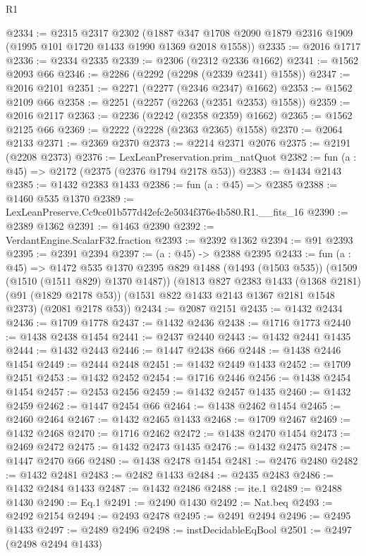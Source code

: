 \begin{lexlean}{R1}
\begin{coremodule}
@2334 := @2315
    @2317
    @2302
    (@1887 @347 @1708 @2090 @1879 @2316 @1909 (@1995 @101 @1720 @1433 @1990 @1369 @2018 @1558))
@2335 := @2016 @1717
@2336 := @2334 @2335
@2339 := @2306 (@2312 @2336 @1662)
@2341 := @1562 @2093 @66
@2346 := @2286 (@2292 (@2298 (@2339 @2341) @1558))
@2347 := @2016 @2101
@2351 := @2271 (@2277 (@2346 @2347) @1662)
@2353 := @1562 @2109 @66
@2358 := @2251 (@2257 (@2263 (@2351 @2353) @1558))
@2359 := @2016 @2117
@2363 := @2236 (@2242 (@2358 @2359) @1662)
@2365 := @1562 @2125 @66
@2369 := @2222 (@2228 (@2363 @2365) @1558)
@2370 := @2064 @2133
@2371 := @2369 @2370
@2373 := @2214 @2371 @2076
@2375 := @2191 (@2208 @2373)
@2376 := LexLeanPreservation.prim_natQuot
@2382 := fun (a : @45) => @2172 (@2375 (@2376 @1794 @2178 @53))
@2383 := @1434 @2143
@2385 := @1432 @2383 @1433
@2386 := fun (a : @45) => @2385
@2388 := @1460 @535 @1370
@2389 := LexLeanPreserve.Cc9ce01b577d42efc2e5034f376e4b580.R1.__fits_16
@2390 := @2389 @1362
@2391 := @1463 @2390
@2392 := VerdantEngine.ScalarF32.fraction
@2393 := @2392 @1362
@2394 := @91 @2393
@2395 := @2391 @2394
@2397 := (a : @45) -> @2388 @2395
@2433 := fun (a : @45) =>
  @1472
    @535
    @1370
    @2395
    @829
    @1488
    (@1493 (@1503 @535))
    (@1509 (@1510 (@1511 @829) @1370 @1487))
    (@1813
      @827
      @2383
      @1433
      (@1368 @2181)
      (@91 (@1829 @2178 @53))
      (@1531 @822 @1433 @2143 @1367 @2181 @1548 @2373)
      (@2081 @2178 @53))
@2434 := @2087 @2151
@2435 := @1432 @2434
@2436 := @1709 @1778
@2437 := @1432 @2436
@2438 := @1716 @1773
@2440 := @1438 @2438 @1454
@2441 := @2437 @2440
@2443 := @1432 @2441 @1435
@2444 := @1432 @2443
@2446 := @1447 @2438 @66
@2448 := @1438 @2446 @1454
@2449 := @2444 @2448
@2451 := @1432 @2449 @1433
@2452 := @1709 @2451
@2453 := @1432 @2452
@2454 := @1716 @2446
@2456 := @1438 @2454 @1454
@2457 := @2453 @2456
@2459 := @1432 @2457 @1435
@2460 := @1432 @2459
@2462 := @1447 @2454 @66
@2464 := @1438 @2462 @1454
@2465 := @2460 @2464
@2467 := @1432 @2465 @1433
@2468 := @1709 @2467
@2469 := @1432 @2468
@2470 := @1716 @2462
@2472 := @1438 @2470 @1454
@2473 := @2469 @2472
@2475 := @1432 @2473 @1435
@2476 := @1432 @2475
@2478 := @1447 @2470 @66
@2480 := @1438 @2478 @1454
@2481 := @2476 @2480
@2482 := @1432 @2481
@2483 := @2482 @1433
@2484 := @2435 @2483
@2486 := @1432 @2484 @1433
@2487 := @1432 @2486
@2488 := ite.{1}
@2489 := @2488 @1430
@2490 := Eq.{1}
@2491 := @2490 @1430
@2492 := Nat.beq
@2493 := @2492 @2154
@2494 := @2493 @2478
@2495 := @2491 @2494
@2496 := @2495 @1433
@2497 := @2489 @2496
@2498 := instDecidableEqBool
@2501 := @2497 (@2498 @2494 @1433)

\end{coremodule}
\end{lexlean}
